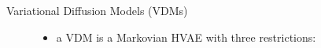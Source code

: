 \begin{frame}{Variational Diffusion Models (VDMs)}
    \begin{figure}
        \begin{itemize}
            \setlength{\itemsep}{8pt}
            \item a VDM is a Markovian HVAE with three restrictions:
                  \begin{itemize}
                      \setlength{\itemsep}{8pt}
                  \end{itemize}
        \end{itemize}
    \end{figure}
\end{frame}